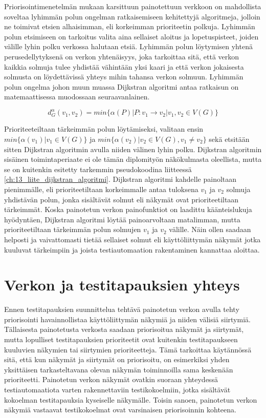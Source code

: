   Priorisointimenetelmän mukaan karsittuun painotettuun verkkoon on mahdollista soveltaa lyhimmän polun ongelman ratkaisemiseen kehitettyjä algoritmeja, jolloin ne toimivat etsien alhaisimman, eli korkeimman prioriteetin polkuja.
  Lyhimmän polun etsimiseen on tarkoitus valita aina sellaiset aloitus ja lopetuspisteet, joiden välille lyhin polku verkossa halutaan etsiä.
  Lyhimmän polun löytymisen yhtenä perusedellytyksenä on verkon yhtenäisyys, joka tarkoittaa sitä, että verkon kaikkia solmuja tulee yhdistää vähintään yksi kaari ja että verkon jokaisesta solmusta on löydettävissä yhteys mihin tahansa verkon solmuun.
  Lyhimmän polun ongelma johon muun muassa Dijkstran algoritmi antaa ratkaisun on matemaattisessa muodossaan seuraavanlainen.

  \[d_G^\alpha(v_1, v_2) = min\{\alpha(P) | P:v_1 \rightarrow v_2 | v_1, v_2 \in V(G)\}\]

  Prioriteeteiltaan tärkeimmän polun löytämiseksi, valitaan ensin \(min\{\alpha(v_1) | v_1 \in V(G)\}\) ja \(min\{\alpha(v_2) | v_2 \in V(G), v_1 \neq v_2\}\) sekä etsitään sitten Dijkstran algoritmin avulla niiden välinen lyhin polku.
  Dijkstran algoritmin sisäinen toimintaperiaate ei ole tämän diplomityön näkökulmasta oleellista, mutta se on kuitenkin esitetty tarkemmin pseudokoodina liitteessä \ref{ch:13_liite_dijkstran_algoritmi}.
  Dijkstran algoritmi kahdelle painoltaan pienimmälle, eli prioriteetiltaan korkeimmalle antaa tuloksena \(v_1\) ja \(v_2\) solmuja yhdistävän polun, jonka sisältävät solmut eli näkymät ovat prioriteetiltaan tärkeimmät.
  Koska painotetun verkon painofunktiot on laadittu käänteislukuja hyödyntäen, Dijkstran algoritmi löytää painoarvoltaan matalimman, mutta prioriteetiltaan tärkeimmän polun solmujen \(v_1\) ja \(v_2\) välille.
  Näin ollen saadaan helposti ja vaivattomasti tietää sellaiset solmut eli käyttöliittymän näkymät jotka kuuluvat tärkeimpiin ja joista testiautomaation rakentaminen kannattaa aloittaa.

\section{Verkon ja testitapauksien yhteys} \label{ch:10_verkon_ja_testitapauksien_yhteys}

  Ennen testitapauksien suunnittelua tehtävä painotetun verkon avulla tehty priorisointi havainnollistaa käyttöliittymän näkymiä ja niiden välisiä siirtymiä.
  Tällaisesta painotetusta verkosta saadaan priorisoitua näkymät ja siirtymät, mutta lopulliset testitapauksien prioriteetit ovat kuitenkin testitapaukseen kuuluvien näkymien tai siirtymien prioriteetteja.
  Tämä tarkoittaa käytännössä sitä, että kun näkymät ja siirtymät on priorisoitu, on esimerkiksi yhden yksittäisen tarkasteltavana olevan näkymän toiminnoilla sama keskenään prioriteetti.
  Painotetun verkon näkymät ovatkin suoraan yhteydessä testiautomaatiota varten rakennettaviin testikokoelmiin, jotka sisältävät kokoelman testitapauksia kyseiselle näkymälle.
  Toisin sanoen, painotetun verkon näkymiä vastaavat testikokoelmat ovat varsinaisen priorisoinnin kohteena.

